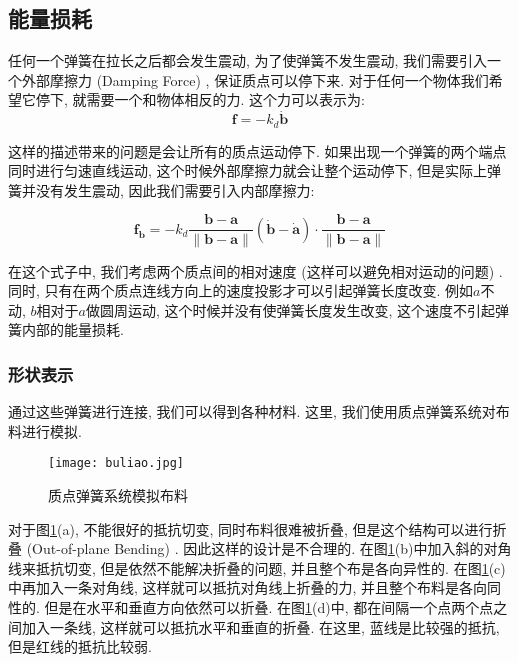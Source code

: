 \documentclass[openany]{progbookcn}
\begin{document}
\subsection{能量损耗}

任何一个弹簧在拉长之后都会发生震动, 为了使弹簧不发生震动, 我们需要引入一个外部摩擦力 (Damping Force) , 保证质点可以停下来. 对于任何一个物体我们希望它停下, 就需要一个和物体相反的力. 这个力可以表示为: 
\begin{equation}
	\mathbf{f}=-k_d\mathbf{\dot{b}}
\end{equation}

这样的描述带来的问题是会让所有的质点运动停下. 如果出现一个弹簧的两个端点同时进行匀速直线运动, 这个时候外部摩擦力就会让整个运动停下, 但是实际上弹簧并没有发生震动, 因此我们需要引入内部摩擦力: 

\begin{equation}
	\mathbf{f}_{\mathbf{b}}=-k_{d}\frac{\mathbf{b}-\mathbf{a}}{\|\mathbf{b}-\mathbf{a}\|}(\dot{\mathbf{b}}-\dot{\mathbf{a}})\cdot \frac{\mathbf{b}-\mathbf{a}}{\|\mathbf{b}-\mathbf{a}\|}
\end{equation}

在这个式子中, 我们考虑两个质点间的相对速度 (这样可以避免相对运动的问题) . 同时, 只有在两个质点连线方向上的速度投影才可以引起弹簧长度改变. 例如$a$不动, $b$相对于$a$做圆周运动, 这个时候并没有使弹簧长度发生改变, 这个速度不引起弹簧内部的能量损耗. 

\subsubsection{形状表示}

通过这些弹簧进行连接, 我们可以得到各种材料. 这里, 我们使用质点弹簧系统对布料进行模拟. 

\begin{figure}[H]
	\centering
	\texttt{[image: buliao.jpg]}
	\caption{质点弹簧系统模拟布料}
	\label{fig:buliao}
\end{figure}

对于图\ref{fig:buliao}(a), 不能很好的抵抗切变, 同时布料很难被折叠, 但是这个结构可以进行折叠 (Out-of-plane Bending) . 因此这样的设计是不合理的. 在图\ref{fig:buliao}(b)中加入斜的对角线来抵抗切变, 但是依然不能解决折叠的问题, 并且整个布是各向异性的. 在图\ref{fig:buliao}(c)中再加入一条对角线, 这样就可以抵抗对角线上折叠的力, 并且整个布料是各向同性的. 但是在水平和垂直方向依然可以折叠. 在图\ref{fig:buliao}(d)中, 都在间隔一个点两个点之间加入一条线, 这样就可以抵抗水平和垂直的折叠. 在这里, 蓝线是比较强的抵抗, 但是红线的抵抗比较弱. 
\end{document}
